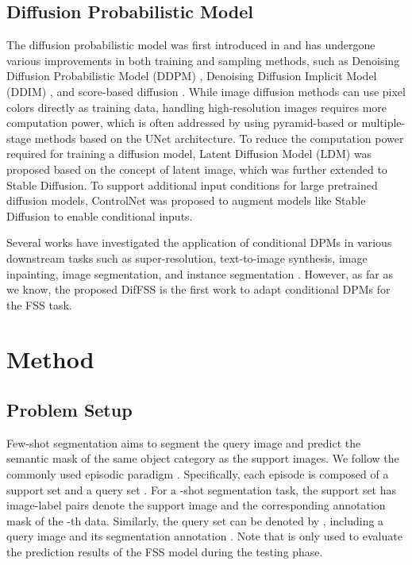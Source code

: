 \documentclass[sigconf]{acmart}
\begin{document}
\subsection{Diffusion Probabilistic Model}
The diffusion probabilistic model was first introduced in \cite{sohl2015deep} and has undergone various improvements in both training and sampling methods, such as Denoising Diffusion Probabilistic Model (DDPM) \cite{ho2020denoising}, Denoising Diffusion Implicit Model (DDIM) \cite{nichol2021improved}, and score-based diffusion \cite{zimmermann2021score}. While image diffusion methods can use pixel colors directly as training data, handling high-resolution images requires more computation power, which is often addressed by using pyramid-based or multiple-stage methods \cite{ho2022cascaded} based on the UNet architecture. To reduce the computation power required for training a diffusion model, Latent Diffusion Model (LDM) \cite{wang2018high} was proposed based on the concept of latent image, which was further extended to Stable Diffusion. To support additional input conditions for large pretrained diffusion models, ControlNet \cite{zhang2023adding} was proposed to augment models like Stable Diffusion to enable conditional inputs.

Several works have investigated the application of conditional DPMs in various downstream tasks such as super-resolution, text-to-image synthesis, image inpainting, image segmentation, and instance segmentation \cite{ho2020denoising,rombach2022high,saharia2022photorealistic,rombach2022high,rombach2022text,choi2021ilvr,zimmermann2021score,baranchuk2021label}. However, as far as we know, the proposed DifFSS is the first work to adapt conditional DPMs for the FSS task.


\section{Method}
\subsection{Problem Setup}
Few-shot segmentation aims to segment the query image and predict the semantic mask of the same object category as the support images. We follow the commonly used episodic paradigm \cite{ppn}. Specifically, each episode is composed of a support set  and a query set . For a -shot segmentation task, the support set  has  image-label pairs  denote the support image and the corresponding annotation mask of the -th data. Similarly, the query set can be denoted by , including a query image  and its segmentation annotation . Note that  is only used to evaluate the prediction results  of the FSS model during the testing phase.
\end{document}
